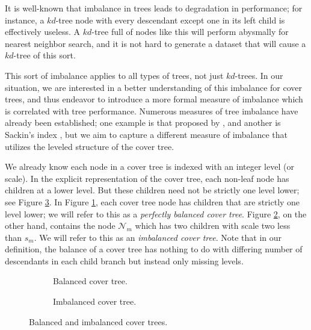 It is well-known that imbalance in trees leads to degradation in performance;
for instance, a $kd$-tree node with every descendant except one in its left
child is effectively useless.  A $kd$-tree full of nodes like this will perform
abysmally for nearest neighbor search, and it is not hard to generate a dataset
that will cause a $kd$-tree of this sort.

This sort of imbalance applies to all types of trees, not just $kd$-trees.  In
our situation, we are interested in a better understanding of this imbalance for
cover trees, and thus endeavor to introduce a more formal measure of imbalance
which is correlated with tree performance.  Numerous measures of tree
imbalance have already been established; one example is that proposed by
\citet{colless1982review}, and another is Sackin's index \citep{sackin1972good},
but we aim to capture a different measure of imbalance that utilizes the leveled
structure of the cover tree.

We already know each node in a cover tree is indexed with an integer level (or
scale).  In the explicit representation of the cover tree, each non-leaf node
has children at a lower level.  But these children need not be strictly one
level lower; see Figure \ref{fig:imbalance}.  In Figure
\ref{fig:imbalance-good}, each cover tree node has children that are strictly
one level lower; we will refer to this as a {\em perfectly balanced cover tree}.
Figure \ref{fig:imbalance-bad}, on the other hand, contains the node
$\mathscr{N}_m$ which has two children with scale two less than $s_m$.  We will
refer to this as an {\em imbalanced cover tree}.  Note that in our definition,
the balance of a cover tree has nothing to do with differing number of
descendants in each child branch but instead only missing levels.

\begin{figure}
\begin{subfigure}[b]{0.585\textwidth}
  \begin{center}
    
  \end{center}
  \caption{Balanced cover tree.}
  \label{fig:imbalance-good}
\end{subfigure}
\begin{subfigure}[b]{0.415\textwidth}
  \begin{center}
    
  \end{center}
  \caption{Imbalanced cover tree.}
  \label{fig:imbalance-bad}
\end{subfigure}
\caption{Balanced and imbalanced cover trees.}
\label{fig:imbalance}
\end{figure}

